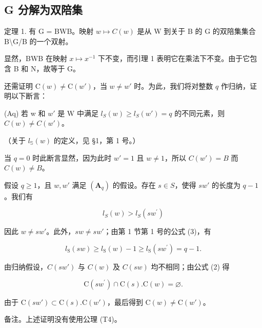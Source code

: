 \subsection{G 分解为双陪集}

定理 1. 有 G = BWB。映射 \(w \mapsto C(w)\) 是从 W 到关于 B 的 G 的双陪集集合 B\textbackslash G/B 的一个双射。

显然，BWB 在映射 \(x \mapsto x^{-1}\) 下不变，而引理 1 表明它在乘法下不变。由于它包含 B 和 N，故等于 G。

还需证明 \(\mathrm{C}(w) \neq \mathrm{C}(w')\)，当 \(w \neq w'\) 时。为此，我们将对整数 \(q\) 作归纳，证明以下断言：

(Aq) 若 w 和 \(w'\) 是 W 中满足 \(l_{S}(w) \geqslant l_{S}(w') = q\) 的不同元素，则 \(C(w) \neq C(w')\)。

（关于 \(l_{\mathbb{S}}(w)\) 的定义，见 §1，第 1 号。）

当 \(q = 0\) 时此断言显然，因为此时 \(w' = 1\) 且 \(w \neq 1\)，所以 \(C(w') = B\) 而 \(C(w) \neq B\)。

假设 \(q \geqslant 1\)，且 \(w, w'\) 满足 \((\mathbf{A}_q)\) 的假设。存在 \(s \in S\)，使得 \(sw'\) 的长度为 \(q - 1\)。我们有

\[
l _ {S} (w) > l _ {S} \left(s w ^ {\prime}\right)\tag{6}
\]

因此 \(w \neq sw'\)。此外，\(sw \neq sw'\)；由第 1 节第 1 号的公式 (3)，有

\[
l _ {\mathrm{S}} (s w) \geqslant l _ {\mathrm{S}} (w) - 1 \geqslant l _ {\mathrm{S}} (s w ^ {\prime}) = q - 1.\tag{7}
\]

由归纳假设，\(C(sw')\) 与 \(C(w)\) 及 \(C(sw)\) 均不相同；由公式 (2) 得

\[
\mathrm{C} (s w ^ {\prime}) \cap \mathrm{C} (s). \mathrm{C} (w) = \varnothing .\tag{8}
\]

由于 \(\mathrm{C}(sw') \subset \mathrm{C}(s).\mathrm{C}(w')\)，最后得到 \(\mathrm{C}(w) \neq \mathrm{C}(w')\)。

备注。上述证明没有使用公理 (T4)。

